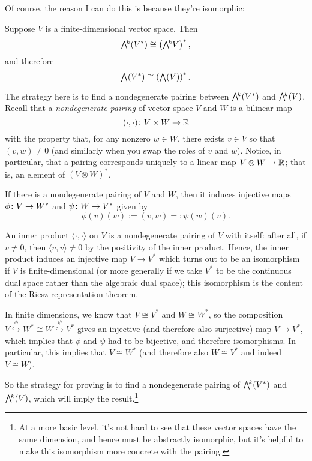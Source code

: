 Of course, the reason I can do this is because they're isomorphic:

\begin{lemma}\label{lem:exterior powers and duals}
	Suppose $V$ is a finite-dimensional vector space. Then
	\[
		\ext{k}(V^\ast) \cong \left(\ext{k} V\right)^\ast,
	\]
	and therefore
	\[
		\ext{}(V^\ast) \cong \left(\ext{}(V)\right)^\ast.
	\]
\end{lemma}

The strategy here is to find a nondegenerate pairing between $\ext{k}(V^\ast)$ and $\ext{k} (V)$. Recall that a \emph{nondegenerate pairing} of vector space $V$ and $W$ is a bilinear map
\[
	(\cdot , \cdot ) \colon\thinspace\! V \times W \to \mathbb{R}
\]
with the property that, for any nonzero $w \in W$, there exists $v \in V$ so that $(v,w) \neq 0$ (and similarly when you swap the roles of $v$ and $w$). Notice, in particular, that a pairing corresponds uniquely to a linear map $V \otimes W \to \mathbb{R}$; that is, an element of $(V \otimes W)^\ast$.

If there is a nondegenerate pairing of $V$ and $W$, then it induces injective maps $\phi \colon\thinspace\! V \to W^\ast$ and $\psi \colon\thinspace\! W \to V^\ast$ given by
\[
	\phi(v)(w) := (v,w) =: \psi(w)(v).
\]

\begin{example}
	An inner product $\langle \cdot , \cdot \rangle$ on $V$ is a nondegenerate pairing of $V$ with itself: after all, if $v \neq 0$, then $\langle v , v \rangle \neq 0$ by the positivity of the inner product. Hence, the inner product induces an injective map $V \to V^\ast$ which turns out to be an isomorphism if $V$ is finite-dimensional (or more generally if we take $V^\ast$ to be the continuous dual space rather than the algebraic dual space); this isomorphism is the content of the Riesz representation theorem.
\end{example}

In finite dimensions, we know that $V \cong V^\ast$ and $W \cong W^\ast$, so the composition $V \overset{\phi}{\hookrightarrow} W^\ast \cong W \overset{\psi}{\hookrightarrow} V^\ast$ gives an injective (and therefore also surjective) map $V \to V^\ast$, which implies that $\phi$ and $\psi$ had to be bijective, and therefore isomorphisms. In particular, this implies that $V \cong W^\ast$ (and therefore also $W \cong V^\ast$ and indeed $V \cong W$).

So the strategy for proving  is to find a nondegenerate pairing of $\ext{k}(V^\ast)$ and $\ext{k}(V)$, which will imply the result.\footnote{At a more basic level, it's not hard to see that these vector spaces have the same dimension, and hence must be abstractly isomorphic, but it's helpful to make this isomorphism more concrete with the pairing.}

